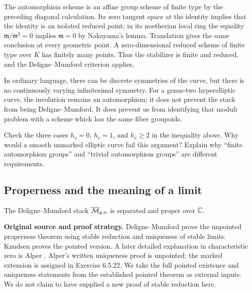 The automorphism scheme is an affine group scheme of finite type
by the preceding diagonal calculation. Its zero tangent space at
the identity implies that the identity is an isolated reduced
point: in its noetherian local ring the equality
$\mathfrak m/\mathfrak m^2=0$ implies $\mathfrak m=0$ by
Nakayama's lemma. Translation gives the same conclusion at every
geometric point. A zero-dimensional reduced scheme of finite
type over $K$ has finitely many points. Thus the stabilizer is
finite and reduced, and the Deligne--Mumford criterion applies.

In ordinary language, there can be discrete symmetries of the
curve, but there is no continuously varying infinitesimal symmetry.
For a genus-two hyperelliptic curve, the involution remains an
automorphism; it does not prevent the stack from being
Deligne--Mumford. It does prevent us from identifying that moduli
problem with a scheme which has the same fiber groupoids.

\begin{Ej}\label{ex:curve-dm}
Check the three cases $h_v=0$, $h_v=1$, and $h_v\geq2$ in the
inequality above. Why would a smooth unmarked elliptic curve fail
this argument? Explain why ``finite automorphism groups'' and
``trivial automorphism groups'' are different requirements.
\end{Ej}

\subsection{Properness and the meaning of a limit}

\begin{Prop}\label{prop:curves-proper}
The Deligne--Mumford stack $\overline{\mathcal M}_{g,n}$ is separated and proper over
$\mathbb C$.
\end{Prop}

\noindent\textbf{Original source and proof strategy.}
Deligne--Mumford \cite[Section 2 and Theorem (5.2),
pp.~104--105]{DM} prove the unpointed properness theorem using
stable reduction and uniqueness of stable limits.
Knudsen \cite[Theorem 2.7, p.~179]{Knudsen} proves the pointed
version. A later detailed explanation in characteristic zero is
Alper \cite[Theorem 6.5.1 and Section 6.5.1, pp.~242--247;
Proposition 6.5.20 and Theorem 6.5.23, pp.~251--252]{Alper}.
Alper's written uniqueness proof is unpointed; the marked
extension is assigned in Exercise 6.5.22. We take the full pointed
existence and uniqueness statements from the established pointed
theorem as external inputs. We do not claim to have supplied a
new proof of stable reduction here.

